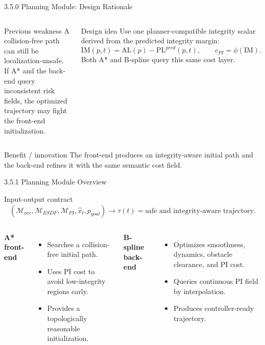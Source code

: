 \documentclass[10pt,aspectratio=169,xcolor=dvipsnames]{beamer}
\newcommand{\PL}{\mathrm{PL}}
\newcommand{\AL}{\mathrm{AL}}
\newcommand{\IM}{\mathrm{IM}}
\newcommand{\Mmap}{\mathcal{M}}
\begin{document}
\begin{frame}{3.5.0 Planning Module: Design Rationale}

  \small
  \begin{columns}[T]
    \begin{alertblock}{Previous weakness}
      \footnotesize
      A collision-free path can still be localization-unsafe. If A* and the back-end query inconsistent risk fields, the optimized trajectory may fight the front-end initialization.
    \end{alertblock}
    \begin{exampleblock}{Design idea}
      \footnotesize
      Use one planner-compatible integrity scalar derived from the predicted integrity margin:
      \[
        \IM(p,t)=\AL(p)-\PL^{pred}(p,t),\qquad c_{PI}=\phi(\IM).
      \]
      Both A* and B-spline query this same cost layer.
    \end{exampleblock}
  \end{columns}
  \begin{block}{Benefit / innovation}
    \footnotesize The front-end produces an integrity-aware initial path and the back-end refines it with the same semantic cost field.
  \end{block}

\end{frame}

\begin{frame}{3.5.1 Planning Module Overview}
  \small
  \begin{block}{Input-output contract}
    \vspace{-4pt}
    \[
      \left(\Mmap_{occ},\Mmap_{ESDF},\Mmap_{PI},\hat{x}_t,p_{goal}\right)
      \longrightarrow
      \tau(t)=\text{safe and integrity-aware trajectory}.
    \]
  \end{block}

  \begin{columns}[T]
    \textbf{A* front-end}
    \begin{itemize}\footnotesize
      \item Searches a collision-free initial path.
      \item Uses PI cost to avoid low-integrity regions early.
      \item Provides a topologically reasonable initialization.
    \end{itemize}

    \textbf{B-spline back-end}
    \begin{itemize}\footnotesize
      \item Optimizes smoothness, dynamics, obstacle clearance, and PI cost.
      \item Queries continuous PI field by interpolation.
      \item Produces controller-ready trajectory.
    \end{itemize}
  \end{columns}
\end{frame}
\end{document}
